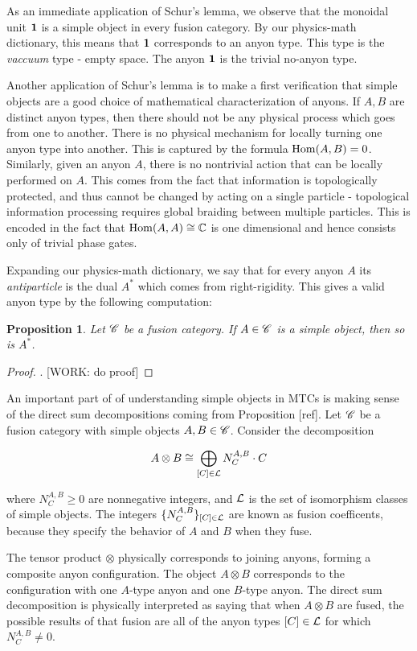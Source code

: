 \documentclass{article}
\newtheorem{proposition}{Proposition}[section]
\theoremstyle{definition}
\numberwithin{figure}{section}
\begin{document}
As an immediate application of Schur's lemma, we observe that the monoidal unit $\mathbf{1}$ is a simple object in every fusion category. By our physics-math dictionary, this means that $\mathbf{1}$ corresponds to an anyon type. This type is the \textit{vaccuum} type - empty space. The anyon $\mathbf{1}$ is the trivial no-anyon type.

Another application of Schur's lemma is to make a first verification that simple objects are a good choice of mathematical characterization of anyons. If $A,B$ are distinct anyon types, then there should not be any physical process which goes from one to another. There is no physical mechanism for locally turning one anyon type into another. This is captured by the formula $\mathrm{Hom}(A,B)=0$. Similarly, given an anyon $A$, there is no nontrivial action that can be locally performed on $A$. This comes from the fact that information is topologically protected, and thus cannot be changed by acting on a single particle - topological information processing requires global braiding between multiple particles. This is encoded in the fact that $\mathrm{Hom}(A,A)\cong \mathbb{C}$ is one dimensional and hence consists only of trivial phase gates.

Expanding our physics-math dictionary, we say that for every anyon $A$ its \textit{antiparticle} is the dual $A^*$ which comes from right-rigidity. This gives a valid anyon type by the following computation:

\begin{proposition} Let $\mathscr{C}$ be a fusion category. If $A\in \mathscr{C}$ is a simple object, then so is $A^*$.
\end{proposition}
\begin{proof}. [WORK: do proof]
\end{proof}

An important part of of understanding simple objects in MTCs is making sense of the direct sum decompositions coming from Proposition [ref]. Let $\mathscr{C}$ be a fusion category with simple objects $A,B\in \mathscr{C}$. Consider the decomposition

$$A\otimes B \cong \bigoplus_{[C]\in \mathcal{L}}N^{A,B}_{C}\cdot C$$

where $N^{A,B}_{C}\geq 0$ are nonnegative integers, and $\mathcal{L}$ is the set of isomorphism classes of simple objects. The integers $\{N^{A,B}_C\}_{[C]\in \mathcal{L}}$ are known as fusion coefficents, because they specify the behavior of $A$ and $B$ when they fuse.

The tensor product $\otimes$ physically corresponds to joining anyons, forming a composite anyon configuration. The object $A\otimes B$ corresponds to the configuration with one $A$-type anyon and one $B$-type anyon. The direct sum decomposition is physically interpreted as saying that when $A\otimes B$ are fused, the possible results of that fusion are all of the anyon types $[C]\in \mathcal{L}$ for which $N^{A,B}_{C}\neq 0$.
\end{document}
